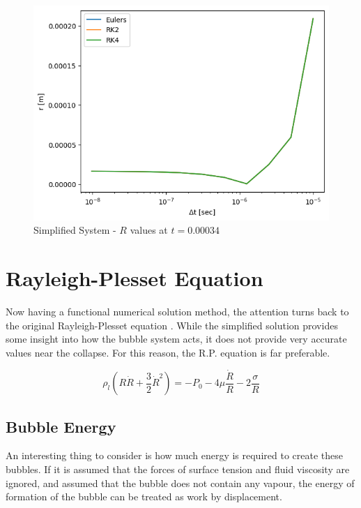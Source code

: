 \documentclass[12pt]{article}
\begin{document}
\begin{figure}[H]
    \centering
    \includegraphics[scale=0.75]{out/error/Question_1/r_at_t.png}
    \caption{Simplified System - $R$ values at $t=0.00034$}
    \label{fig:part_1_r_at_t}
\end{figure}

\clearpage
\section{Rayleigh-Plesset Equation}

Now having a functional numerical solution method, the attention turns back to the original Rayleigh-Plesset equation \cite{rayleigh-eqn}. While the simplified solution provides some insight into how the bubble system acts, it does not provide very accurate values near the collapse. For this reason, the R.P. equation is far preferable.

\begin{equation}
    \label{eqn:part_2_rayleigh}
    \rho_l \left(R \dot R + \frac{3}{2}\dot R^2\right) = -P_0 -4 \mu \frac{\dot R}{R} - 2 \frac{\sigma}{R}
\end{equation}

\subsection{Bubble Energy}
An interesting thing to consider is how much energy is required to create these bubbles. If it is assumed that the forces of surface tension and fluid viscosity are ignored, and assumed that the bubble does not contain any vapour, the energy of formation of the bubble can be treated as work by displacement. 
\end{document}
